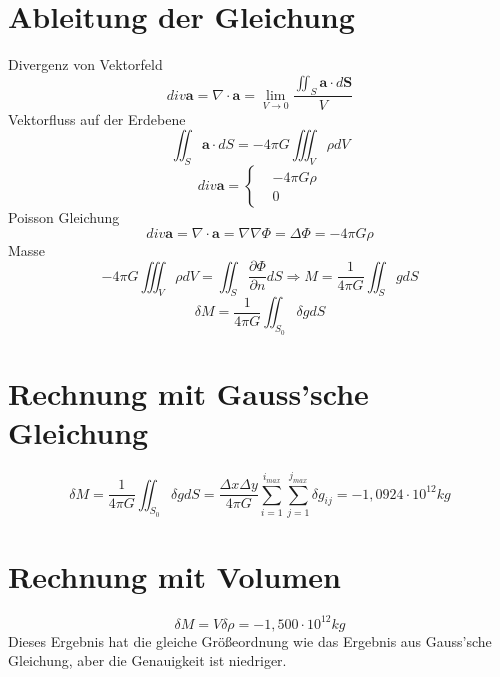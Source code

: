 \documentclass[12pt]{article}
\begin{document}
	\pagestyle{main}
\tableofcontents
\newpage
\section{Ableitung der Gleichung}
Divergenz von Vektorfeld
\begin{equation*}
div \bm{a} = \nabla \cdot \bm{a} = \lim\limits_{V \rightarrow 0} \frac{\iint_S \bm{a} \cdot d \bm{S}}{V}
\end{equation*}
Vektorfluss auf der Erdebene
\begin{equation*}
\iint_S \bm{a} \cdot dS = -4 \pi G \iiint_V \rho  dV
\end{equation*}
\begin{equation*}
div \bm{a} = \begin{cases}
& -4 \pi G \rho \\
& 0
\end{cases}
\end{equation*}
Poisson Gleichung
\begin{equation*}
div \bm{a} = \nabla \cdot \bm{a} = \nabla \nabla \Phi = \Delta \Phi = -4 \pi G \rho
\end{equation*}
Masse
\begin{equation*}
-4 \pi G \iiint_V \rho dV = \iint_S \frac{\partial \Phi}{\partial n} dS \Rightarrow M = \frac{1}{4 \pi G} \iint_S g dS
\end{equation*}
\begin{equation*}
\delta M = \frac{1}{4 \pi G} \iint_{S_0} \delta g dS
\end{equation*}
\section{Rechnung mit Gauss'sche Gleichung}
\begin{equation*}
\delta M = \frac{1}{4 \pi G} \iint_{S_0} \delta g dS = \frac{\Delta x \Delta y}{4 \pi G} \sum_{i = 1}^{i_{max}} \sum_{j = 1}^{j_{max}} \delta g_{ij} = -1,0924 \cdot 10^{12} kg
\end{equation*}
\section{Rechnung mit Volumen}
\begin{equation*}
\delta M = V \delta \rho = -1,500 \cdot 10^{12} kg
\end{equation*}
Dieses Ergebnis hat die gleiche Größeordnung wie das Ergebnis aus Gauss'sche Gleichung, aber die Genauigkeit ist niedriger. 
\end{document}
